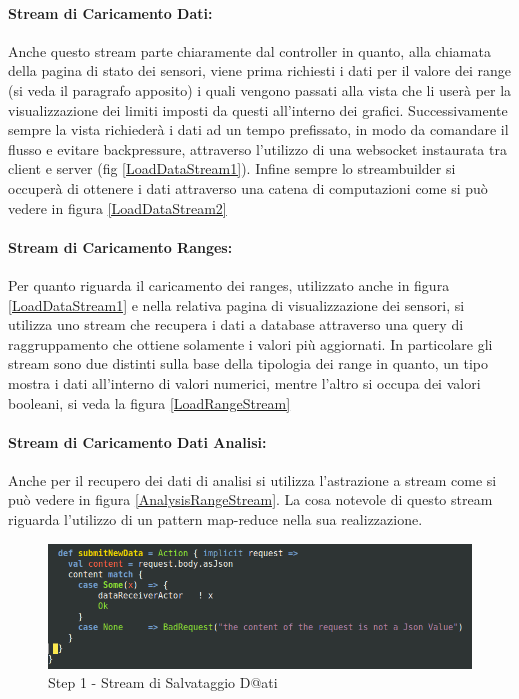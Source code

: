 \paragraph{Stream di Caricamento Dati:} Anche questo stream parte chiaramente dal controller in quanto, alla chiamata della pagina di stato dei sensori, viene prima richiesti i dati per il valore dei range (si veda il paragrafo apposito) i quali vengono passati alla vista che li user\`a per la visualizzazione dei limiti imposti da questi all'interno dei grafici. Successivamente sempre la vista richieder\`a i dati ad un tempo prefissato, in modo da comandare il flusso e evitare backpressure, attraverso l'utilizzo di una websocket instaurata tra client e server (fig \ref{LoadDataStream1}). Infine sempre lo streambuilder si occuper\`a di ottenere i dati attraverso una catena di computazioni come si pu\`o vedere in figura \ref{LoadDataStream2}

\paragraph{Stream di Caricamento Ranges:} Per quanto riguarda il caricamento dei ranges, utilizzato anche in figura \ref{LoadDataStream1} e nella relativa pagina di visualizzazione dei sensori, si utilizza uno stream che recupera i dati a database attraverso una query di raggruppamento che ottiene solamente i valori pi\`u aggiornati. In particolare gli stream sono due distinti sulla base della tipologia dei range in quanto, un tipo mostra i dati all'interno di valori numerici, mentre l'altro si occupa dei valori booleani, si veda la figura \ref{LoadRangeStream}

\paragraph{Stream di Caricamento Dati Analisi:} Anche per il recupero dei dati di analisi si utilizza l'astrazione a stream come si pu\`o vedere in figura \ref{AnalysisRangeStream}. La cosa notevole di questo stream riguarda l'utilizzo di un pattern map-reduce nella sua realizzazione.

\begin{figure}[h]
\centering
\includegraphics[scale=0.5,natwidth=610,natheight=642]{Figures/Project/Server/Interaction/SaveDataStream/DataStream1.png}
\caption{Step 1 - Stream di Salvataggio D@ati}
\label{SaveDataStream1}
\end{figure}

